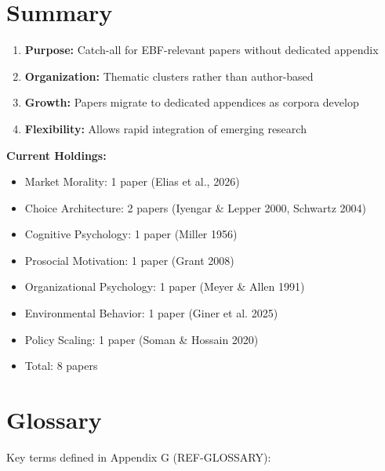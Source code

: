 \section{Summary}
\label{sec:ot-summary}

\begin{tcolorbox}[colback=blue!5!white,colframe=blue!75!black,title=Key Takeaways]
\begin{enumerate}
    \item \textbf{Purpose:} Catch-all for EBF-relevant papers without dedicated appendix
    \item \textbf{Organization:} Thematic clusters rather than author-based
    \item \textbf{Growth:} Papers migrate to dedicated appendices as corpora develop
    \item \textbf{Flexibility:} Allows rapid integration of emerging research
\end{enumerate}

\textbf{Current Holdings:}
\begin{itemize}
    \item Market Morality: 1 paper (Elias et al., 2026)
    \item Choice Architecture: 2 papers (Iyengar \& Lepper 2000, Schwartz 2004)
    \item Cognitive Psychology: 1 paper (Miller 1956)
    \item Prosocial Motivation: 1 paper (Grant 2008)
    \item Organizational Psychology: 1 paper (Meyer \& Allen 1991)
    \item Environmental Behavior: 1 paper (Giner et al. 2025)
    \item Policy Scaling: 1 paper (Soman \& Hossain 2020)
    \item Total: 8 papers
\end{itemize}
\end{tcolorbox}

\section{Glossary}
\label{sec:ot-glossary}

Key terms defined in Appendix G (REF-GLOSSARY):

